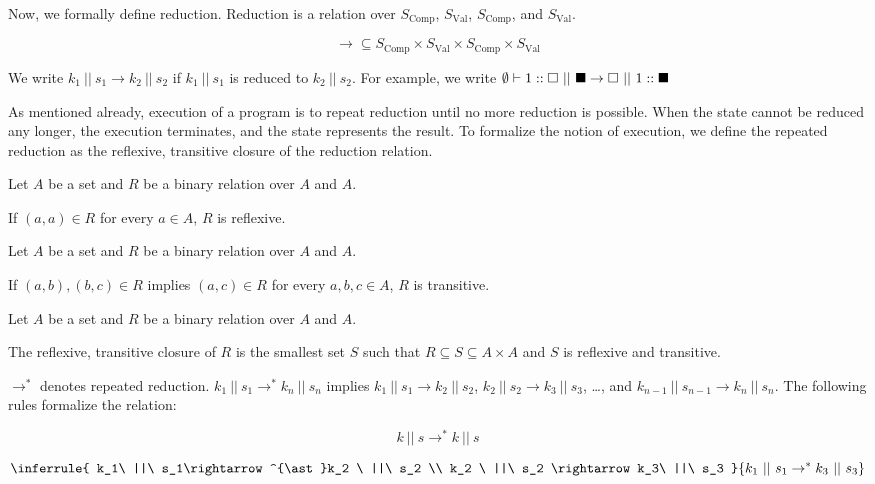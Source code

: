 Now, we formally define reduction.
Reduction is a relation over $S_{\text{Comp}}$, $S_{\text{Val}}$,
$S_{\text{Comp}}$, and $S_{\text{Val}}$.

\[\rightarrow\subseteq S_{\text{Comp}}\times S_{\text{Val}}\times
S_{\text{Comp}} \times S_{\text{Val}}\]

We write $k_1\ ||\ s_1\rightarrow k_2\ ||\ s_2$ if $k_1\ ||\ s_1$ is reduced to
$k_2\ ||\ s_2$. For example, we write
$\evalk{\emptyset}{1}\mtk\ ||\ \mts\rightarrow \mtk\ ||\ \conss{1}\mts$

As mentioned already, execution of a program is to repeat reduction until no
more reduction is possible. When the state cannot be reduced any longer, the
execution terminates, and the state represents the result. To formalize the
notion of execution, we define the repeated reduction as the reflexive,
transitive closure of the reduction relation.

\begin{kaobox}[frametitle=Reflexive relations]
Let $A$ be a set and $R$ be a binary relation over $A$ and $A$.

If $(a,a)\in R$ for every $a\in A$, $R$ is reflexive.
\end{kaobox}

\begin{kaobox}[frametitle=Transitive relations]
Let $A$ be a set and $R$ be a binary relation over $A$ and $A$.

If $(a,b),(b,c)\in R$ implies $(a,c)\in R$ for every $a,b,c\in A$, $R$ is
transitive.
\end{kaobox}

\begin{kaobox}[frametitle={Reflexive, transitive closures}]
Let $A$ be a set and $R$ be a binary relation over $A$ and $A$.

The reflexive, transitive closure of $R$ is the smallest set $S$ such that $R\subseteq
  S\subseteq A\times A$ and $S$ is reflexive and transitive.
\end{kaobox}

$\rightarrow^\ast$ denotes repeated reduction. $k_1\ ||\ s_1\rightarrow^\ast k_n\
||\ s_n$ implies $k_1\ ||\ s_1\rightarrow k_2\ ||\ s_2$, $k_2\ ||\ s_2\rightarrow
k_3\ ||\ s_3$, …, and $k_{n-1}\ ||\ s_{n-1}\rightarrow k_n\ ||\ s_n$. The
following rules formalize the relation:

\[k\ ||\ s\rightarrow^{\ast}k\ ||\ s\]

\[
\inferrule
{ k_1\ ||\ s_1\rightarrow^{\ast}k_2 \ ||\ s_2 \\
  k_2 \ ||\ s_2 \rightarrow k_3\ ||\ s_3 }
{ k_1\ ||\ s_1\rightarrow^{\ast}k_3\ ||\ s_3 }
\]

